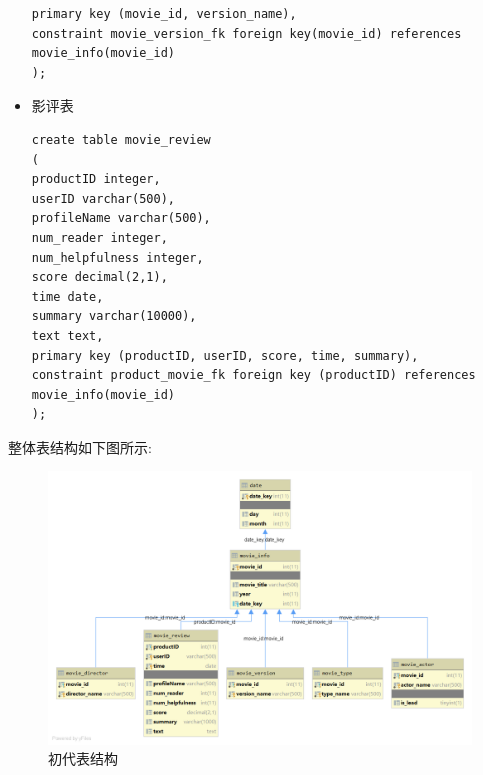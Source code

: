 \documentclass{ctexrep}
\begin{document}
\begin{itemize}
\begin{lstlisting}
primary key (movie_id, version_name),
constraint movie_version_fk foreign key(movie_id) references movie_info(movie_id)
);
            \end{lstlisting}
        \item 影评表
            \begin{lstlisting}
create table movie_review
(
productID integer,
userID varchar(500),
profileName varchar(500),
num_reader integer,
num_helpfulness integer,
score decimal(2,1),
time date,
summary varchar(10000),
text text,
primary key (productID, userID, score, time, summary),
constraint product_movie_fk foreign key (productID) references movie_info(movie_id)
);
            \end{lstlisting}
	\end{itemize}
    整体表结构如下图所示:
    \begin{figure}[H]
		\centering
		\includegraphics[width=0.7\linewidth]{img/MySQL_DB1.png}
		\caption{初代表结构}
		\label{fig:MySQL_DB1}
	\end{figure}
\end{document}
